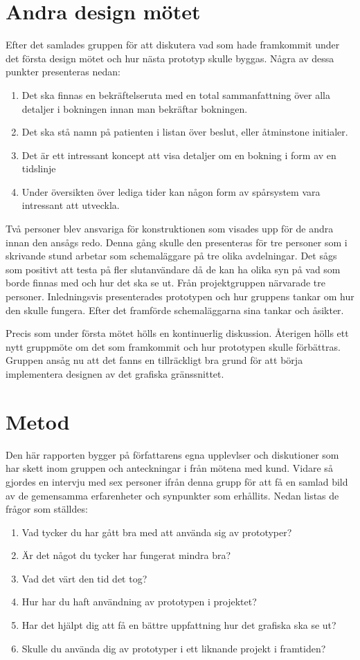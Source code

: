 \section{Andra design mötet}
Efter det samlades gruppen för att diskutera vad som hade framkommit under det första design mötet och hur nästa prototyp skulle byggas. Några av dessa punkter  presenteras nedan:
\begin{enumerate}
	\item Det ska finnas en bekräftelseruta med en total sammanfattning över alla detaljer i bokningen innan man 	 			  	  bekräftar bokningen.
 	\item Det ska stå namn på patienten i listan över beslut, eller åtminstone initialer.
 	\item Det är ett intressant koncept att visa detaljer om en bokning i form av en tidslinje
 	\item Under översikten över lediga tider kan någon form av spårsystem vara intressant att utveckla.
\end{enumerate}
Två personer blev ansvariga för konstruktionen som visades upp för de andra innan den ansågs redo. Denna gång skulle den presenteras för tre personer som i skrivande stund arbetar som schemaläggare på tre olika avdelningar. Det sågs som positivt att testa på fler slutanvändare då de kan ha olika syn på vad som borde finnas med och hur det ska se ut. Från projektgruppen närvarade tre personer. Inledningsvis presenterades prototypen och hur gruppens tankar om hur den skulle fungera. Efter det framförde schemaläggarna sina tankar och åsikter. 

Precis som under första mötet hölls en kontinuerlig diskussion. Återigen hölls ett nytt gruppmöte om det som framkommit och hur prototypen skulle förbättras. Gruppen ansåg nu att det fanns en tillräckligt bra grund för att börja implementera designen av det grafiska gränssnittet.
  
\section{Metod}
Den här rapporten bygger på författarens egna upplevlser och diskutioner som har skett inom gruppen och anteckningar i från mötena med kund. Vidare så gjordes en intervju med sex personer ifrån denna grupp för att få en samlad bild av de gemensamma erfarenheter och synpunkter som erhållits. Nedan listas de frågor som ställdes:
\begin{enumerate}
	\item Vad tycker du har gått bra med att använda sig av prototyper?
 	\item Är det något du tycker har fungerat mindra bra?
 	\item Vad det värt den tid det tog?
 	\item Hur har du haft användning av prototypen i projektet?
 	\item Har det hjälpt dig att få en bättre uppfattning hur det grafiska ska se ut?
 	\item Skulle du använda dig av prototyper i ett liknande projekt i framtiden? 
\end{enumerate}
 
